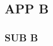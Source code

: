 \documentclass[entropy,article,submit,pdftex,moreauthors]{Definitions/mdpi}
\begin{document}
\section[\appendixname~\thesection]{}
\subsection[\appendixname~\thesubsection]{APP B}

\subsubsection{SUB B}

\end{document}
